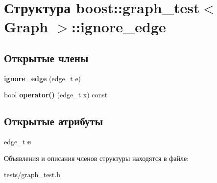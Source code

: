 \hypertarget{structboost_1_1graph__test_1_1ignore__edge}{}\section{Структура boost\+:\+:graph\+\_\+test$<$ Graph $>$\+:\+:ignore\+\_\+edge}
\label{structboost_1_1graph__test_1_1ignore__edge}
\subsection*{Открытые члены}
\begin{DoxyCompactItemize}
\item 
\mbox{\label{structboost_1_1graph__test_1_1ignore__edge_a83cdc37986d330481abd87d49195dd25}} 
{\bfseries ignore\+\_\+edge} (edge\+\_\+t e)
\item 
\mbox{\label{structboost_1_1graph__test_1_1ignore__edge_a3515fdaf8d0f89bc9c00182443c41e97}} 
bool {\bfseries operator()} (edge\+\_\+t x) const
\end{DoxyCompactItemize}
\subsection*{Открытые атрибуты}
\begin{DoxyCompactItemize}
\item 
\mbox{\label{structboost_1_1graph__test_1_1ignore__edge_ad51c6031e8dea8f7e0d9ae02ce752885}} 
edge\+\_\+t {\bfseries e}
\end{DoxyCompactItemize}


Объявления и описания членов структуры находятся в файле\+:\begin{DoxyCompactItemize}
\item 
tests/graph\+\_\+test.\+h\end{DoxyCompactItemize}
